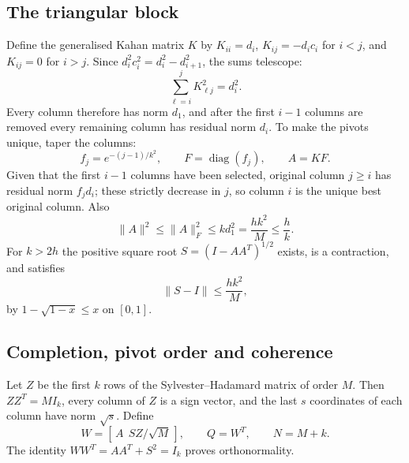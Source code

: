 \documentclass[11pt,a4paper]{article}
\theoremstyle{definition}
\numberwithin{equation}{section}
\begin{document}
\subsection{The triangular block}
Define the generalised Kahan matrix $K$ by $K_{ii}=d_i$, $K_{ij}=-d_ic_i$ for $i<j$, and $K_{ij}=0$ for $i>j$. Since
$d_i^2c_i^2=d_i^2-d_{i+1}^2$, the sums telescope:
\begin{equation}\label{eq:K-telescope}
 \sum_{\ell=i}^jK_{\ell j}^2=d_i^2.
\end{equation}
Every column therefore has norm $d_1$, and after the first $i-1$ columns are removed every remaining column has
residual norm $d_i$. To make the pivots unique, taper the columns:
\begin{equation}\label{eq:taper}
 f_j=e^{-(j-1)/k^2},\qquad F=\operatorname{diag}(f_j),\qquad A=KF.
\end{equation}
Given that the first $i-1$ columns have been selected, original column $j\ge i$ has residual norm $f_jd_i$; these
strictly decrease in $j$, so column $i$ is the unique best original column. Also
\begin{equation}\label{eq:A-norm}
 \|A\|^2\le\|A\|_F^2\le kd_1^2=\frac{hk^2}M\le\frac hk.
\end{equation}
For $k>2h$ the positive square root $S=(I-AA^T)^{1/2}$ exists, is a contraction, and satisfies
\begin{equation}\label{eq:S}
 \|S-I\|\le\frac{hk^2}M,
\end{equation}
by $1-\sqrt{1-x}\le x$ on $[0,1]$.

\subsection{Completion, pivot order and coherence}
Let $Z$ be the first $k$ rows of the Sylvester--Hadamard matrix of order $M$. Then $ZZ^T=MI_k$, every column of $Z$
is a sign vector, and the last $s$ coordinates of each column have norm $\sqrt s$. Define
\begin{equation}\label{eq:W}
 W=[\,A\ \ SZ/\sqrt M\,],\qquad Q=W^T,\qquad N=M+k.
\end{equation}
The identity $WW^T=AA^T+S^2=I_k$ proves orthonormality.
\end{document}
